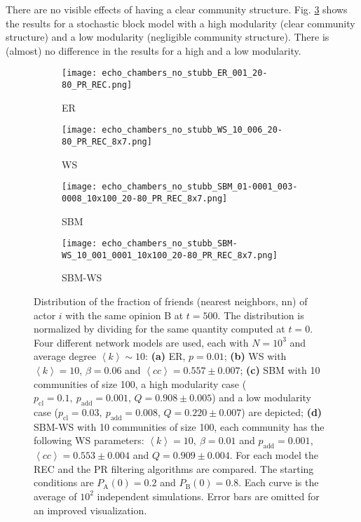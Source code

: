 \documentclass[11 pt , letterpaper , twoside , openright]{book}
\begin{document}
\newline
There are no visible effects of having a clear community structure. Fig. \ref{sbm} shows the results for a stochastic block model with a high modularity (clear community structure) and a low modularity (negligible community structure). There is (almost) no difference in the results for a high and a low modularity.
\newpage
\begin{figure}[H]
  \begin{subfigure}[b]{0.49\textwidth}
    \caption{ER}
  	\texttt{[image: echo\_chambers\_no\_stubb\_ER\_001\_20-80\_PR\_REC.png]}
    \label{er_echo_20-80}
  \end{subfigure}
  \begin{subfigure}[b]{0.49\textwidth}
    \caption{WS}
  	\texttt{[image: echo\_chambers\_no\_stubb\_WS\_10\_006\_20-80\_PR\_REC\_8x7.png]}
    \label{ws}
  \end{subfigure}
  \begin{subfigure}[b]{0.49\textwidth}
    \caption{SBM}
    \texttt{[image: echo\_chambers\_no\_stubb\_SBM\_01-0001\_003-0008\_10x100\_20-80\_PR\_REC\_8x7.png]}
  	\label{sbm}    
  \end{subfigure}
  \begin{subfigure}[b]{0.49\textwidth}
    \caption{SBM-WS}
    \texttt{[image: echo\_chambers\_no\_stubb\_SBM-WS\_10\_001\_0001\_10x100\_20-80\_PR\_REC\_8x7.png]}
    \label{sbm-ws}
  \end{subfigure}
  \captionsetup{format=plain}
  \caption[Distribution of the fraction of friends (nearest neighbors, nn) of actor $i$ with the same opinion B at $t=500$, $\left<P_\text{B}^{\text{nn}}\right>$, for an initial $20/80$ opinion distribution.]{Distribution of the fraction of friends (nearest neighbors, nn) of actor $i$ with the same opinion B at $t = 500$. The distribution is normalized by dividing for the same quantity computed at $t=0$. Four different network models are used, each with $N = 10^3$ and average degree $\left<k\right> \sim 10$: \textbf{(a)} ER, $p=0.01$; \textbf{(b)} WS with $\left<k\right> = 10$, $\beta = 0.06$ and $\left<cc\right> = 0.557 \pm 0.007$; \textbf{(c)} SBM with 10 communities of size 100, a high modularity case ($p_{\text{cl}} = 0.1,\ p_{\text{add}} = 0.001$, $Q = 0.908 \pm 0.005$) and a low modularity case ($p_{\text{cl}} = 0.03,\ p_{\text{add}} = 0.008$, $Q = 0.220 \pm 0.007$) are depicted; \textbf{(d)} SBM-WS with 10 communities of size 100, each community has the following WS parameters: $\left<k\right> = 10,\ \beta = 0.01$ and $p_{\text{add}} = 0.001$, $\left<cc\right> = 0.553 \pm 0.004$ and $Q = 0.909 \pm 0.004$. For each model the REC and the PR filtering algorithms are compared. The starting conditions are $P_\text{A}(0) = 0.2$ and $P_\text{B}(0) = 0.8$. Each curve is the average of $10^2$ independent simulations. Error bars are omitted for an improved visualization.}
\label{echo_20_80}
\end{figure}
\end{document}
